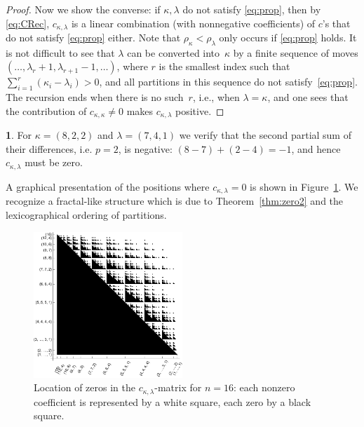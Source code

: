 \documentclass{mathincs}
\numberwithin{equation}{section}
\numberwithin{figure}{section}
\theoremstyle{plain}
\theoremstyle{definition}
\theoremstyle{remark}
\theoremstyle{plain}
\theoremstyle{definition}
\newtheorem{example}[thm]{\protect\examplename}
\theoremstyle{plain}
\theoremstyle{plain}
\providecommand{\examplename}{Example}
\begin{document}
\begin{proof}
  Now we show the converse: if $\kappa,\lambda$ do not satisfy
  \eqref{eq:prop}, then by \eqref{eq:CRec}, $c_{\kappa,\lambda}$ is a linear
  combination (with nonnegative coefficients) of $c$'s that do not satisfy
  \eqref{eq:prop} either.  Note that $\rho_\kappa<\rho_\lambda$ only occurs if
  \eqref{eq:prop} holds. It is not difficult to see that $\lambda$ can be
  converted into~$\kappa$ by a finite sequence of moves
  $(\dots,\lambda_r+1,\lambda_{r+1}-1,\dots)$, where $r$ is the smallest index
  such that $\sum_{i=1}^r (\kappa_i - \lambda_i) > 0$, and all partitions in
  this sequence do not satisfy~\eqref{eq:prop}. The recursion ends when there
  is no such~$r$, i.e., when $\lambda=\kappa$, and one sees that the
  contribution of $c_{\kappa,\kappa}\neq0$ makes $c_{\kappa,\lambda}$ positive.
\end{proof}

\begin{example}
  For $\kappa=(8,2,2)$ and $\lambda=(7,4,1)$ we verify that the second
  partial sum of their differences, i.e. $p=2$, is negative:
  $(8-7)+(2-4)=-1$, and hence $c_{\kappa,\lambda}$ must be zero.
\end{example}

A graphical presentation of the positions where $c_{\kappa,\lambda}=0$ is
shown in Figure~\ref{fig:zeros}. We recognize a fractal-like structure which
is due to Theorem~\ref{thm:zero2} and the lexicographical ordering of
partitions.

\begin{figure}
  \begin{center}
    \includegraphics[width=0.5\textwidth]{zeros.pdf}
  \end{center}
  \caption{Location of zeros in the $c_{\kappa,\lambda}$-matrix for $n=16$:
  each nonzero coefficient is represented by a white square, each zero
  by a black square.}
  \label{fig:zeros}
\end{figure}
\end{document}
